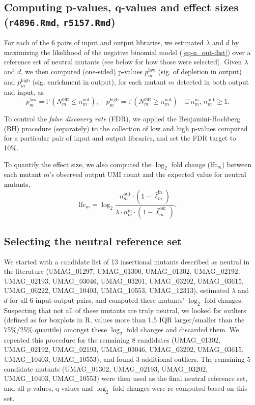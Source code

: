 \documentclass[a4paper,11pt,oneside]{amsart}
\begin{document}
\subsection*{Computing p-values, q-values and effect sizes (\texttt{r4896.Rmd}, \texttt{r5157.Rmd})}

For each of the 6 pairs of input and output libraries, we estimated $\lambda$ and $d$ by maximizing the likelihood of the negative binomial model (\ref{eq-n_out-dist}) over a reference set of neutral mutants (see below for how those were selected). Given $\lambda$ and $d$, we then computed (one-sided) p-values $p^\text{low}_m$ (sig. of depletion in output) and $p^\text{high}_m$ (sig. enrichment in output), for each mutant $m$ detected in both output and input, as
\begin{equation}
  p^\text{low}_m = \mathbb{P}\left(N^\text{out}_m \leq n^\text{out}_m\right), \quad
  p^\text{high}_m = \mathbb{P}\left(N^\text{out}_m \geq n^\text{out}_m\right)
  \quad\text{if}\ n^\text{in}_m,\,n^\text{out}_m \geq 1.
\end{equation}

To control the \emph{false discovery rate} (FDR), we applied the Benjamini-Hochberg (BH) procedure\cite{Benjamini1995} (separately) to the collection of low and high p-values computed for a particular pair of input and output libraries, and set the FDR target to 10\%.

To quantify the effect size, we also computed the $\log_2$ fold change ($\text{lfc}_m$) between each mutant $m$'s observed output UMI count and the expected value for neutral mutants,
\begin{equation}
  \text{lfc}_m = \log_2 \frac{n^\text{out}_m\cdot(1-\bar\ell^\text{in}_m)}{\lambda\cdot n^\text{in}_m\cdot(1-\bar\ell^\text{out}_m)}.
\end{equation}

\subsection*{Selecting the neutral reference set}

We started with a candidate list of 13 insertional mutants described as neutral in the literature (UMAG\_01297, UMAG\_01300, UMAG\_01302, UMAG\_02192, UMAG\_02193, UMAG\_03046, UMAG\_03201, UMAG\_03202, UMAG\_03615, UMAG\_06222, UMAG\_10403, UMAG\_10553, UMAG\_12313), estimated $\lambda$ and $d$ for all 6 input-output pairs, and computed these mutants' $\log_2$ fold changes. Suspecting that not all of these mutants are truly neutral, we looked for outliers (defined as for boxplots in R, values more than 1.5 IQR larger/smaller than the 75\%/25\% quantile) amongst these $\log_2$ fold changes and discarded them. We repeated this procedure for the remaining 8 candidates (UMAG\_01302, UMAG\_02192, UMAG\_02193, UMAG\_03046, UMAG\_03202, UMAG\_03615, UMAG\_10403, UMAG\_10553), and found 3 additional outliers. The remaining 5 candidate mutants (UMAG\_01302, UMAG\_02193, UMAG\_03202, UMAG\_10403, UMAG\_10553) were then used as the final neutral reference set, and all p-values, q-values and $\log_2$ fold changes were re-computed based on this set.
\end{document}
